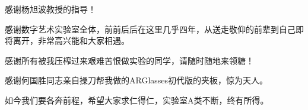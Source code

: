 
\begin{thanks}

  感谢杨旭波教授的指导！
  
  感谢数字艺术实验室全体，前前后后在这里几乎四年，从送走敬仰的前辈到自己即将离开，非常高兴能和大家相遇。
  
  感谢所有被我压榨过来艰难苦恨做实验的同学，请随时随地来领糖！
  
  感谢何国胜同志亲自操刀帮我做的ARGlasses初代版的夹板，惊为天人。
  
  如今我们要各奔前程，希望大家求仁得仁，实验室A类不断，终有所得。

\end{thanks}
